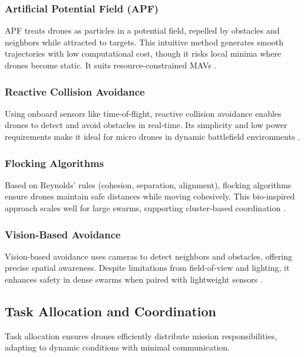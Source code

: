 \documentclass{article}
\begin{document}
\subsubsection{Artificial Potential Field (APF)}
APF treats drones as particles in a potential field, repelled by obstacles and neighbors while attracted to targets. This intuitive method generates smooth trajectories with low computational cost, though it risks local minima where drones become static. It suits resource-constrained MAVs \cite{Khatib1986, Zhang2020}.

\subsubsection{Reactive Collision Avoidance}
Using onboard sensors like time-of-flight, reactive collision avoidance enables drones to detect and avoid obstacles in real-time. Its simplicity and low power requirements make it ideal for micro drones in dynamic battlefield environments \cite{Gageik2015, Lin2020}.

\subsubsection{Flocking Algorithms}
Based on Reynolds’ rules (cohesion, separation, alignment), flocking algorithms ensure drones maintain safe distances while moving cohesively. This bio-inspired approach scales well for large swarms, supporting cluster-based coordination \cite{Reynolds1987, OlfatiSaber2006}.

\subsubsection{Vision-Based Avoidance}
Vision-based avoidance uses cameras to detect neighbors and obstacles, offering precise spatial awareness. Despite limitations from field-of-view and lighting, it enhances safety in dense swarms when paired with lightweight sensors \cite{Ross2018, Wang2020}.

\subsection{Task Allocation and Coordination}
Task allocation ensures drones efficiently distribute mission responsibilities, adapting to dynamic conditions with minimal communication.
\end{document}
